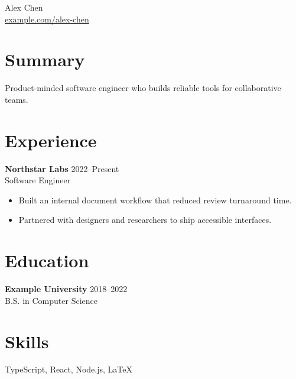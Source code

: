 \documentclass[11pt]{article}
\begin{document}
\begin{center}
  {\LARGE Alex Chen}\\
  \href{https://example.com/alex-chen}{example.com/alex-chen}
\end{center}

\section*{Summary}
Product-minded software engineer who builds reliable tools for collaborative teams.

\section*{Experience}
\textbf{Northstar Labs} \hfill 2022--Present\\
Software Engineer
\begin{itemize}[leftmargin=*]
  \item Built an internal document workflow that reduced review turnaround time.
  \item Partnered with designers and researchers to ship accessible interfaces.
\end{itemize}

\section*{Education}
\textbf{Example University} \hfill 2018--2022\\
B.S. in Computer Science

\section*{Skills}
TypeScript, React, Node.js, LaTeX
\end{document}
